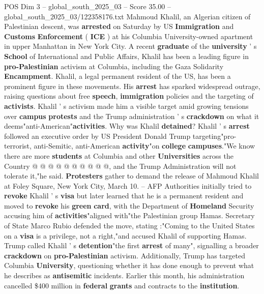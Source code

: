 \begin{textsample}{POS Dim 3 – global\_south\_2025\_03 – Score 35.00 – global\_south\_2025\_03/122358176.txt}  \label{ex:f3_pos_032}
Mahmoud Khalil, an Algerian citizen of Palestinian descent, was \textbf{arrested} on Saturday by US \textbf{Immigration} and \textbf{Customs} \textbf{Enforcement} ( \textbf{ICE} ) at his Columbia University-owned apartment in upper Manhattan in New York City.
A recent \textbf{graduate} of the \textbf{university} ' s \textbf{School} of International and Public Affairs, Khalil has been a leading figure in \textbf{pro-Palestinian} activism at Columbia, including the Gaza Solidarity \textbf{Encampment}.
Khalil, a legal permanent resident of the US, has been a prominent figure in these movements.
His \textbf{arrest} has sparked widespread outrage, raising questions about free \textbf{speech}, \textbf{immigration} policies and the targeting of \textbf{activists}.
Khalil ' s activism made him a visible target amid growing tensions over \textbf{campus} \textbf{protests} and the Trump administration ' s \textbf{crackdown} on what it deems"anti-American"\textbf{activities}.
Why was Khalil \textbf{detained}?
Khalil ' s \textbf{arrest} followed an executive order by US President Donald Trump targeting"pro-terrorist, anti-Semitic, anti-American \textbf{activity}"on \textbf{college} \textbf{campuses}."We know there are more \textbf{students} at Columbia and other \textbf{Universities} across the Country @ @ @ @ @ @ @ @ @ @, and the Trump Administration will not tolerate it,"he said. \textbf{Protesters} gather to demand the release of Mahmoud Khalil at Foley Square, New York City, March 10. -- AFP Authorities initially tried to \textbf{revoke} Khalil ' s \textbf{visa} but later learned that he is a permanent resident and moved to \textbf{revoke} his \textbf{green} \textbf{card}, with the Department of \textbf{Homeland} Security accusing him of \textbf{activities}"aligned with"the Palestinian group Hamas.
Secretary of State Marco Rubio defended the move, stating :"Coming to the United States on a \textbf{visa} is a privilege, not a right,"and accused Khalil of supporting Hamas.
Trump called Khalil ' s \textbf{detention}"the first \textbf{arrest} of many", signalling a broader \textbf{crackdown} on \textbf{pro-Palestinian} activism.
Additionally, Trump has targeted Columbia \textbf{University}, questioning whether it has done enough to prevent what he describes as \textbf{antisemitic} incidents.
Earlier this month, his administration cancelled \$400 million in \textbf{federal} \textbf{grants} and contracts to the \textbf{institution}.

\end{textsample}
